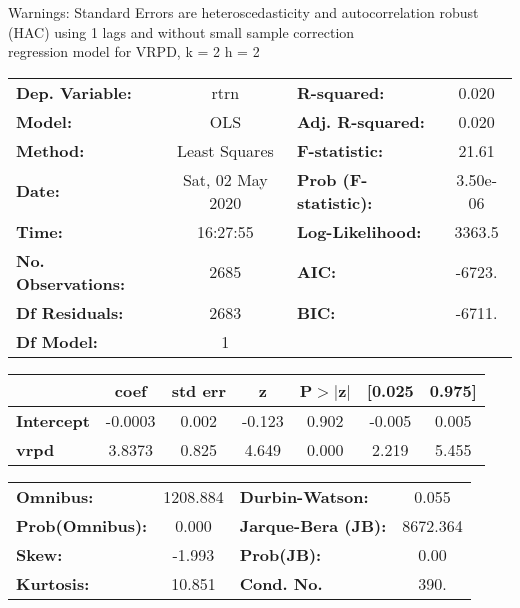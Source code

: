 Warnings: \newline
 [1] Standard Errors are heteroscedasticity and autocorrelation robust (HAC) using 1 lags and without small sample correction\\ 

regression model for VRPD, k = 2 h = 2\begin{center}
\begin{tabular}{lclc}
\toprule
\textbf{Dep. Variable:}    &       rtrn       & \textbf{  R-squared:         } &     0.020   \\
\textbf{Model:}            &       OLS        & \textbf{  Adj. R-squared:    } &     0.020   \\
\textbf{Method:}           &  Least Squares   & \textbf{  F-statistic:       } &     21.61   \\
\textbf{Date:}             & Sat, 02 May 2020 & \textbf{  Prob (F-statistic):} &  3.50e-06   \\
\textbf{Time:}             &     16:27:55     & \textbf{  Log-Likelihood:    } &    3363.5   \\
\textbf{No. Observations:} &        2685      & \textbf{  AIC:               } &    -6723.   \\
\textbf{Df Residuals:}     &        2683      & \textbf{  BIC:               } &    -6711.   \\
\textbf{Df Model:}         &           1      & \textbf{                     } &             \\
\bottomrule
\end{tabular}
\begin{tabular}{lcccccc}
                   & \textbf{coef} & \textbf{std err} & \textbf{z} & \textbf{P$> |$z$|$} & \textbf{[0.025} & \textbf{0.975]}  \\
\midrule
\textbf{Intercept} &      -0.0003  &        0.002     &    -0.123  &         0.902        &       -0.005    &        0.005     \\
\textbf{vrpd}      &       3.8373  &        0.825     &     4.649  &         0.000        &        2.219    &        5.455     \\
\bottomrule
\end{tabular}
\begin{tabular}{lclc}
\textbf{Omnibus:}       & 1208.884 & \textbf{  Durbin-Watson:     } &    0.055  \\
\textbf{Prob(Omnibus):} &   0.000  & \textbf{  Jarque-Bera (JB):  } & 8672.364  \\
\textbf{Skew:}          &  -1.993  & \textbf{  Prob(JB):          } &     0.00  \\
\textbf{Kurtosis:}      &  10.851  & \textbf{  Cond. No.          } &     390.  \\
\bottomrule
\end{tabular}
\end{center}

